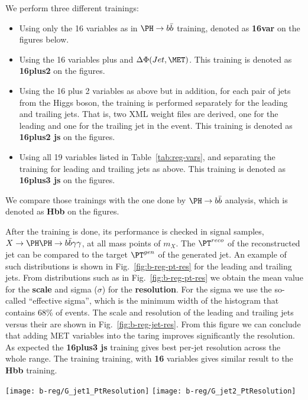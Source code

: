 We perform three different trainings:
\begin{itemize}
\item Using only the 16 variables as in $\Hbb$ training, denoted as
  \textbf{16var} on the figures below.
\item Using the 16 variables plus \MET and $\Delta\Phi(Jet,
  \MET)$. This training is denoted as \textbf{16plus2} on the figures.
\item Using the 16 plus 2 variables as above but in addition, for each
  pair of jets from the Higgs boson, the training is performed
  separately for the leading and trailing jets. That is, two XML
  weight files are derived, one for the leading and one for the
  trailing jet in the event.  This training is denoted as
  \textbf{16plus2 js} on the figures.
\item Using all 19 variables listed in Table~\ref{tab:reg-vars}, and
  separating the training for leading and trailing jets as above. This
  training is denoted as \textbf{16plus3 js} on the figures.
\end{itemize}
We compare those trainings with the one done by $\Hbb$ analysis, which
is denoted as \textbf{Hbb} on the figures.


After the training is done, its performance is checked in signal
samples, $X\to\HH\to\ggbb$, at all mass points of $m_X$.  The
$\PT^{reco}$ of the reconstructed jet can be compared to the target
$\PT^{gen}$ of the generated jet. An example of such distributions is
shown in Fig.~\ref{fig:b-reg-pt-res} for the leading and trailing
jets. From distributions such as in Fig.~\ref{fig:b-reg-pt-res} we
obtain the mean value for the \textbf{scale} and sigma ($\sigma$) for
the \textbf{resolution}. For the sigma we use the so-called
``effective sigma'', which is the minimum width of the histogram that
contains 68\% of events. The scale and resolution of the leading and
trailing jets versus their \PT are shown in
Fig.~\ref{fig:b-reg-jet-res}. From this figure we can conclude that
adding MET variables into the taring improves significantly the
resolution.  As expected the \textbf{16plus3 js} training gives best
per-jet resolution across the whole \PT range. The training training,
with \textbf{16} variables gives similar result to the \textbf{Hbb}
training.

\begin{figure*}[bth]
  \centering
  \texttt{[image: b-reg/G\_jet1\_PtResolution]}\hfil
  \texttt{[image: b-reg/G\_jet2\_PtResolution]}\hfil
  \caption{Relative \PT difference of the reconstructed and generated
    level jets after regression (red histograms) and without
    the regression (blue histograms).}
  \label{fig:b-reg-pt-res}
\end{figure*}

